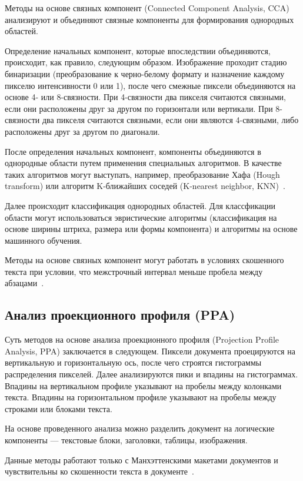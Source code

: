 Методы на основе связных компонент (Connected Component Analysis, CCA) анализируют и объединяют связные компоненты для формирования однородных областей.

Определение начальных компонент, которые впоследствии объединяются, происходит, как правило, следующим образом.
Изображение проходит стадию бинаризации (преобразование к черно-белому формату и назначение каждому пикселю интенсивности 0 или 1), после чего смежные пиксели объединяются на основе 4- или 8-связности.
При 4-связности два пикселя считаются связными, если они расположены друг за другом по горизонтали или вертикали.
При 8-связности два пикселя считаются связными, если они являются 4-связными, либо расположены друг за другом по диагонали.

После определения начальных компонент, компоненты объединяются в однородные области путем применения специальных алгоритмов.
В качестве таких алгоритмов могут выступать, например, преобразование Хафа (Hough transform) или алгоритм K-ближайших соседей (K-nearest neighbor, KNN)~\cite{dla-book}.

Далее происходит классификация однородных областей.
Для классфикации области могут использоваться эвристические алгоритмы (классификация на основе ширины штриха, размера или формы компонента) и алгоритмы на основе машинного обучения.

Методы на основе связных компонент могут работать в условиях скошенного текста при условии, что межстрочный интервал меньше пробела между абзацами~\cite{dla-book}.

\subsection{Анализ проекционного профиля (PPA)}

Суть методов на основе анализа проекционного профиля (Projection Profile Analysis, PPA) заключается в следующем.
Пиксели документа проецируются на вертикальную и горизонтальную ось, после чего строятся гистограммы распределения пикселей.
Далее анализируются пики и впадины на гистограммах.
Впадины на вертикальном профиле указывают на пробелы между колонками текста.
Впадины на горизонтальном профиле указывают на пробелы между строками или блоками текста.

На основе проведенного анализа можно разделить документ на логические компоненты --- текстовые блоки, заголовки, таблицы, изображения.

Данные методы работают только с Манхэттенскими макетами документов и чувствительны ко скошенности текста в документе~\cite{dla-book}.


